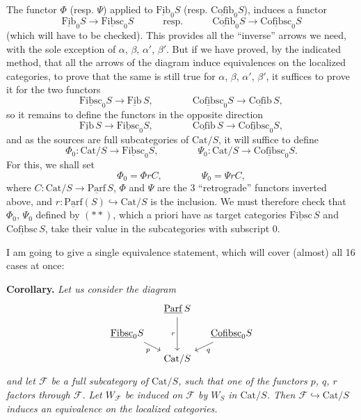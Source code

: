\documentclass[11pt]{article}
\newcommand{\printedpage}[1]{\marginpar{\footnotesize p.~#1}}
\newcommand{\msp}[1]{\marginpar{\footnotesize [#1]}}
\newcommand{\ul}[1]{\underline{\mathrm{#1}}}
\begin{document}
\printedpage{7}
The functor $\Phi$ (resp. $\Psi$) applied to $\ul{Fib}_0S$ (resp. $\ul{Cofib}_0S$), induces a functor
\[
\ul{Fib}_0S \longrightarrow \ul{Fibsc}_0S \qquad\quad \text{resp.} \qquad\quad \ul{Cofib}_0S \longrightarrow \ul{Cofibsc}_0S \tag*{$(*)$}
\]
(which will have to be checked). This provides all the ``inverse'' arrows we need, with the sole exception of $\alpha$, $\beta$, $\alpha'$, $\beta'$. But if we have proved, by the indicated method, that all the arrows of the diagram induce equivalences on the localized categories, to prove that the same is still true for $\alpha$, $\beta$, $\alpha'$, $\beta'$, it suffices to prove it for the two functors
\[
\ul{Fibsc}_0S \longrightarrow \ul{Fib}\,S, \qquad\qquad \ul{Cofibsc}_0S \longrightarrow \ul{Cofib}\,S,
\]
so it remains to define the functors in the opposite direction
\[
\ul{Fib}\,S \longrightarrow \ul{Fibsc}_0S, \qquad\qquad \ul{Cofib}\,S \longrightarrow \ul{Cofibsc}_0S,
\]
and as the sources are full subcategories of $\mathrm{Cat}/S$, it will suffice to define
\[
\Phi_0 : \mathrm{Cat}/S \longrightarrow \ul{Fibsc}_0S, \qquad\qquad \Psi_0 : \mathrm{Cat}/S \longrightarrow \ul{Cofibsc}_0S.
\]
For this, we shall set
\[
\Phi_0 = \Phi r C, \qquad\qquad \Psi_0 = \Psi r C, \tag*{$(**)$}
\]
\msp{page 10}
where $C : \mathrm{Cat}/S \longrightarrow \ul{Parf}\,S$, $\Phi$ and $\Psi$ are the 3 ``retrograde'' functors inverted above, and $r : \ul{Parf}(S) \hookrightarrow \mathrm{Cat}/S$ is the inclusion. We must therefore check that $\Phi_0$, $\Psi_0$ defined by $(**)$, which a priori have as target categories $\ul{Fibsc}\,S$ and $\ul{Cofibsc}\,S$, take their value in the subcategories with subscript 0.

I am going to give a single equivalence statement, which will cover (almost) all 16 cases at once:

\textbf{Corollary.} \textit{Let us consider the diagram}
\[
\begin{tikzcd}[column sep=small, row sep=small]
 & \ul{Parf}\,S \arrow[dd, "r"'] & \\
\ul{Fibsc}_0S \arrow[dr, "p"'] & & \ul{Cofibsc}_0S \arrow[dl, "q"] \\
 & \mathrm{Cat}/S &
\end{tikzcd}
\]
\textit{and let $\mathcal{F}$ be a full subcategory of $\mathrm{Cat}/S$, such that one of the functors $p$, $q$, $r$ factors through $\mathcal{F}$. Let $W_{\mathcal{F}}$ be induced on $\mathcal{F}$ by $W_S$ in $\mathrm{Cat}/S$. Then $\mathcal{F} \hookrightarrow \mathrm{Cat}/S$ induces an equivalence on the localized categories.}
\end{document}
